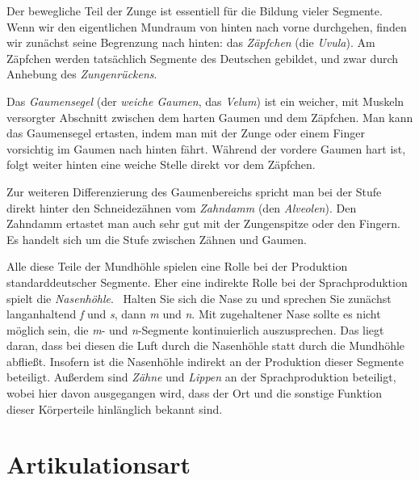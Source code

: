 Der bewegliche Teil der Zunge ist essentiell für die Bildung vieler Segmente.
Wenn wir den eigentlichen Mundraum von hinten nach vorne durchgehen, finden wir zunächst seine Begrenzung nach hinten: das \textit{Zäpfchen} (die \textit{Uvula}).
Am Zäpfchen werden tatsächlich Segmente des Deutschen gebildet, und zwar durch Anhebung des \textit{Zungenrückens}.

Das \textit{Gaumensegel} (der \textit{weiche Gaumen}, das \textit{Velum}) ist ein weicher, mit Muskeln versorgter Abschnitt zwischen dem harten Gaumen und dem Zäpfchen.
Man kann das Gaumensegel ertasten, indem man mit der Zunge oder einem Finger vorsichtig im Gaumen nach hinten fährt.
Während der vordere Gaumen hart ist, folgt weiter hinten eine weiche Stelle direkt vor dem Zäpfchen.

Zur weiteren Differenzierung des Gaumenbereichs spricht man bei der Stufe direkt hinter den Schneidezähnen vom \textit{Zahndamm} (den \textit{Alveolen}).
Den Zahndamm ertastet man auch sehr gut mit der Zungenspitze oder den Fingern.
Es handelt sich um die Stufe zwischen Zähnen und Gaumen.

Alle diese Teile der Mundhöhle spielen eine Rolle bei der Produktion standarddeutscher Segmente.
Eher eine indirekte Rolle bei der Sprachproduktion spielt die \textit{Nasenhöhle}.
\TuBegin~Halten Sie sich die Nase zu und sprechen Sie zunächst langanhaltend \textit{f} und \textit{s}, dann \textit{m} und \textit{n}.
Mit zugehaltener Nase sollte es nicht möglich sein, die \textit{m}- und \textit{n}-Segmente kontinuierlich auszusprechen.
Das liegt daran, dass bei diesen die Luft durch die Nasenhöhle statt durch die Mundhöhle abfließt.
Insofern ist die Nasenhöhle indirekt an der Produktion dieser Segmente beteiligt.
Außerdem sind \textit{Zähne} und \textit{Lippen} an der Sprachproduktion beteiligt, wobei hier davon ausgegangen wird, dass der Ort und die sonstige Funktion dieser Körperteile hinlänglich bekannt sind.


\Stretch[2]

\section{Artikulationsart}
\label{sec:artikulationsart}

